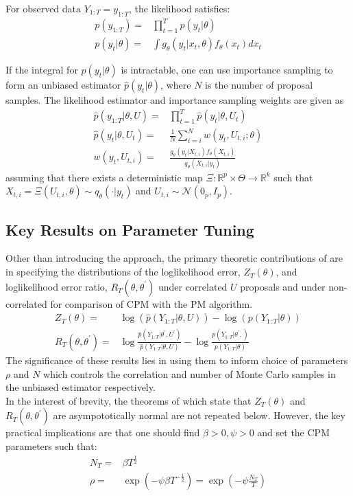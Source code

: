 \documentclass{article}
\begin{document}
For observed data $Y_{1:T}=y_{1:T}$, the likelihood satisfies:
\begin{align*}
p(y_{1:T})=& \prod_{t=1}^{T} p(y_t|\theta) \\
p(y_t| \theta)=& \int g_\theta(y_t|x_t,\theta)f_\theta(x_t) dx_t
\end{align*}

If the integral for $p(y_t| \theta)$ is intractable, one can use importance sampling to form an unbiased estimator $\hat{p}(y_t| \theta)$, where $N$ is the number of proposal samples. The likelihood estimator and importance sampling weights are given as
\begin{align*}
\hat{p}(y_{1:T}| \theta, U) =& \prod_{t=1}^{T} \hat{p}(y_t|\theta, U_t) \\
\hat{p}(y_t| \theta, U_t)=& \frac{1}{N} \sum_{i=i}^N w(y_t, U_{t,i}; \theta ) \\
w(y_t, U_{t,i}) =& \frac{g_\theta(y_t|X_{t,i})f_\theta(X_{t,i})}{q_\theta(X_{t,i}|y_t)}
\end{align*}
assuming that there exists a deterministic map $ \Xi: \mathbb{R}^p \times \Theta \rightarrow \mathbb{R}^k$ such that $X_{t,i} = \Xi(U_{t,i}, \theta) \sim q_\theta(\cdot|y_t)$ and $U_{t,i} \sim \mathcal{N}(0_p, I_p) $.

\subsection{Key Results on Parameter Tuning}

Other than introducing the approach, the primary theoretic contributions of \cite{cpmmDeligiannidis2015} are in specifying the distributions of the loglikelihood error, $Z_T(\theta)$, and loglikelihood error ratio, $R_T(\theta, \theta^\prime)$ under correlated $U$ proposals and under non-correlated for comparison of CPM with the PM algorithm.
\begin{align*}
Z_T(\theta) =& \log(\hat{p}(Y_{1:T}| \theta, U)) - \log(p(Y_{1:T}|\theta)) \\
R_T(\theta, \theta^\prime) =& \log \frac{\hat{p}(Y_{1:T}| \theta^\prime, U^\prime)}{\hat{p}(Y_{1:T}| \theta, U)} - \log \frac{p(Y_{1:T}| \theta^\prime,)}{p(Y_{1:T}| \theta)}
\end{align*}
The significance of these results lies in using them to inform choice of parameters $\rho$ and $N$ which controls the correlation and number of Monte Carlo samples in the unbiased estimator respectively. \\

In the interest of brevity, the theorems of \cite{cpmmDeligiannidis2015} which state that $Z_T(\theta)$ and $R_T(\theta, \theta^\prime)$ are asympototically normal are not repeated below. However, the key practical implications are that one should find $\beta>0, \psi>0$ and set the CPM parameters such that:
\begin{align*}
N_T =& \beta T ^{\frac{1}{2}} \\
\rho =& \exp(-\psi \beta T ^ {-\frac{1}{2}}) = \exp(-\psi \frac{N_T}{T})
\end{align*}
\end{document}
